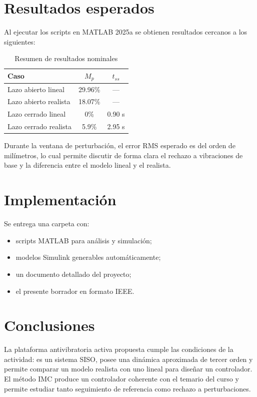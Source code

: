 \documentclass[conference]{IEEEtran}
\begin{document}
\section{Resultados esperados}
Al ejecutar los scripts en MATLAB 2025a se obtienen resultados cercanos a los siguientes:
\begin{table}[!t]
\caption{Resumen de resultados nominales}
\label{tab:resumen}
\centering
\scriptsize
\begin{tabular}{lcc}
\toprule
Caso & $M_p$ & $t_{ss}$ \\
\midrule
Lazo abierto lineal & 29.96\% & --- \\
Lazo abierto realista & 18.07\% & --- \\
Lazo cerrado lineal & 0\% & 0.90 s \\
Lazo cerrado realista & 5.9\% & 2.95 s \\
\bottomrule
\end{tabular}
\end{table}

Durante la ventana de perturbaci\'on, el error RMS esperado es del orden de mil\'imetros, lo cual permite discutir de forma clara el rechazo a vibraciones de base y la diferencia entre el modelo lineal y el realista.

\section{Implementaci\'on}
Se entrega una carpeta con:
\begin{itemize}
\item scripts MATLAB para an\'alisis y simulaci\'on;
\item modelos Simulink generables autom\'aticamente;
\item un documento detallado del proyecto;
\item el presente borrador en formato IEEE.
\end{itemize}

\section{Conclusiones}
La plataforma antivibratoria activa propuesta cumple las condiciones de la actividad: es un sistema SISO, posee una din\'amica aproximada de tercer orden y permite comparar un modelo realista con uno lineal para dise\~nar un controlador. El m\'etodo IMC produce un controlador coherente con el temario del curso y permite estudiar tanto seguimiento de referencia como rechazo a perturbaciones.
\end{document}
